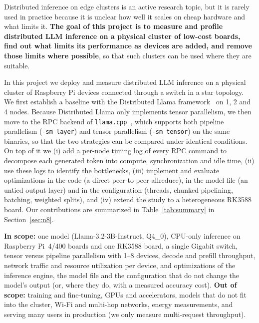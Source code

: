 \documentclass[11pt,a4paper]{article}
\begin{document}
Distributed inference on edge clusters is an active research topic, but it is rarely used in practice because it is unclear how well it scales on cheap hardware and what limits it. \textbf{The goal of this project is to measure and profile distributed LLM inference on a physical cluster of low-cost boards, find out what limits its performance as devices are added, and remove those limits where possible}, so that such clusters can be used where they are suitable.

In this project we deploy and measure distributed LLM inference on a physical cluster of Raspberry Pi devices connected through a switch in a star topology. We first establish a baseline with the Distributed Llama framework~\cite{distributedllama} on 1, 2 and 4 nodes. Because Distributed Llama only implements tensor parallelism, we then move to the RPC backend of \texttt{llama.cpp}~\cite{llamacpp}, which supports both pipeline parallelism (\texttt{-sm layer}) and tensor parallelism (\texttt{-sm tensor}) on the same binaries, so that the two strategies can be compared under identical conditions. On top of it we (i) add a per-node timing log of every RPC command to decompose each generated token into compute, synchronization and idle time, (ii) use these logs to identify the bottlenecks, (iii) implement and evaluate optimizations in the code (a direct peer-to-peer allreduce), in the model file (an untied output layer) and in the configuration (threads, chunked pipelining, batching, weighted splits), and (iv) extend the study to a heterogeneous RK3588 board. Our contributions are summarized in Table~\ref{tab:summary} in Section~\ref{sec:n8}.

\textbf{In scope:} one model (Llama-3.2-3B-Instruct, Q4\_0), CPU-only inference on Raspberry Pi~4/400 boards and one RK3588 board, a single Gigabit switch, tensor versus pipeline parallelism with 1--8 devices, decode and prefill throughput, network traffic and resource utilization per device, and optimizations of the inference engine, the model file and the configuration that do not change the model's output (or, where they do, with a measured accuracy cost).
\textbf{Out of scope:} training and fine-tuning, GPUs and accelerators, models that do not fit into the cluster, Wi-Fi and multi-hop networks, energy measurements, and serving many users in production (we only measure multi-request throughput).
\end{document}
